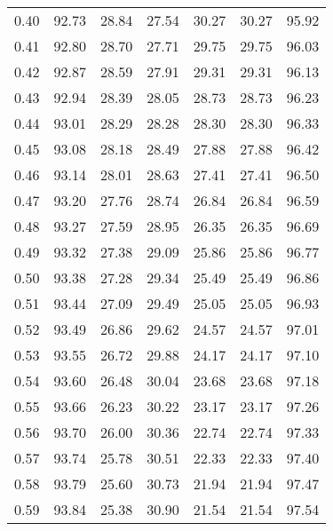 \begin{tabular}{|c|c|c|c|c|c|c|}
      0.40 &     92.73 &     28.84 &      27.54 &   30.27 &      30.27 &         95.92 \\
      0.41 &     92.80 &     28.70 &      27.71 &   29.75 &      29.75 &         96.03 \\
      0.42 &     92.87 &     28.59 &      27.91 &   29.31 &      29.31 &         96.13 \\
      0.43 &     92.94 &     28.39 &      28.05 &   28.73 &      28.73 &         96.23 \\
      0.44 &     93.01 &     28.29 &      28.28 &   28.30 &      28.30 &         96.33 \\
      0.45 &     93.08 &     28.18 &      28.49 &   27.88 &      27.88 &         96.42 \\
      0.46 &     93.14 &     28.01 &      28.63 &   27.41 &      27.41 &         96.50 \\
      0.47 &     93.20 &     27.76 &      28.74 &   26.84 &      26.84 &         96.59 \\
      0.48 &     93.27 &     27.59 &      28.95 &   26.35 &      26.35 &         96.69 \\
      0.49 &     93.32 &     27.38 &      29.09 &   25.86 &      25.86 &         96.77 \\
      0.50 &     93.38 &     27.28 &      29.34 &   25.49 &      25.49 &         96.86 \\
      0.51 &     93.44 &     27.09 &      29.49 &   25.05 &      25.05 &         96.93 \\
      0.52 &     93.49 &     26.86 &      29.62 &   24.57 &      24.57 &         97.01 \\
      0.53 &     93.55 &     26.72 &      29.88 &   24.17 &      24.17 &         97.10 \\
      0.54 &     93.60 &     26.48 &      30.04 &   23.68 &      23.68 &         97.18 \\
      0.55 &     93.66 &     26.23 &      30.22 &   23.17 &      23.17 &         97.26 \\
      0.56 &     93.70 &     26.00 &      30.36 &   22.74 &      22.74 &         97.33 \\
      0.57 &     93.74 &     25.78 &      30.51 &   22.33 &      22.33 &         97.40 \\
      0.58 &     93.79 &     25.60 &      30.73 &   21.94 &      21.94 &         97.47 \\
      0.59 &     93.84 &     25.38 &      30.90 &   21.54 &      21.54 &         97.54 \\

\end{tabular}
